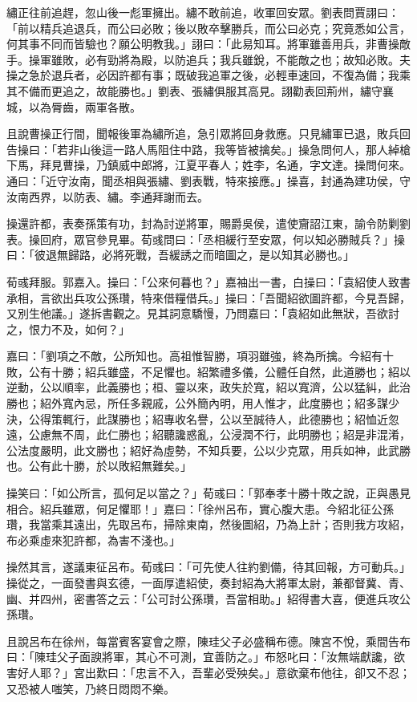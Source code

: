 繡正往前追趕，忽山後一彪軍擁出。繡不敢前追，收軍回安眾。劉表問賈詡曰：「前以精兵追退兵，而公曰必敗；後以敗卒擊勝兵，而公曰必克；究竟悉如公言，何其事不同而皆驗也？願公明教我。」詡曰：「此易知耳。將軍雖善用兵，非曹操敵手。操軍雖敗，必有勁將為殿，以防追兵；我兵雖銳，不能敵之也；故知必敗。夫操之急於退兵者，必因許都有事；既破我追軍之後，必輕車速回，不復為備；我乘其不備而更追之，故能勝也。」劉表、張繡俱服其高見。詡勸表回荊州，繡守襄城，以為脣齒，兩軍各散。

且說曹操正行間，聞報後軍為繡所追，急引眾將回身救應。只見繡軍已退，敗兵回告操曰：「若非山後這一路人馬阻住中路，我等皆被擒矣。」操急問何人，那人綽槍下馬，拜見曹操，乃鎮威中郎將，江夏平春人；姓李，名通，字文達。操問何來。通曰：「近守汝南，聞丞相與張繡、劉表戰，特來接應。」操喜，封通為建功侯，守汝南西界，以防表、繡。李通拜謝而去。

操還許都，表奏孫策有功，封為討逆將軍，賜爵吳侯，遣使齎詔江東，諭令防剿劉表。操回府，眾官參見畢。荀彧問曰：「丞相緩行至安眾，何以知必勝賊兵？」操曰：「彼退無歸路，必將死戰，吾緩誘之而暗圖之，是以知其必勝也。」

荀彧拜服。郭嘉入。操曰：「公來何暮也？」嘉袖出一書，白操曰：「袁紹使人致書承相，言欲出兵攻公孫瓚，特來借糧借兵。」操曰：「吾聞紹欲圖許都，今見吾歸，又別生他議。」遂拆書觀之。見其詞意驕慢，乃問嘉曰：「袁紹如此無狀，吾欲討之，恨力不及，如何？」

嘉曰：「劉項之不敵，公所知也。高祖惟智勝，項羽雖強，終為所擒。今紹有十敗，公有十勝；紹兵雖盛，不足懼也。紹繁禮多儀，公體任自然，此道勝也；紹以逆動，公以順率，此義勝也；桓、靈以來，政失於寬，紹以寬濟，公以猛糾，此治勝也；紹外寬內忌，所任多親戚，公外簡內明，用人惟才，此度勝也；紹多謀少決，公得策輒行，此謀勝也；紹專收名譽，公以至誠待人，此德勝也；紹恤近忽遠，公慮無不周，此仁勝也；紹聽讒惑亂，公浸潤不行，此明勝也；紹是非混淆，公法度嚴明，此文勝也；紹好為虛勢，不知兵要，公以少克眾，用兵如神，此武勝也。公有此十勝，於以敗紹無難矣。」

操笑曰：「如公所言，孤何足以當之？」荀彧曰：「郭奉孝十勝十敗之說，正與愚見相合。紹兵雖眾，何足懼耶！」嘉曰：「徐州呂布，實心腹大患。今紹北征公孫瓚，我當乘其遠出，先取呂布，掃除東南，然後圖紹，乃為上計；否則我方攻紹，布必乘虛來犯許都，為害不淺也。」

操然其言，遂議東征呂布。荀彧曰：「可先使人往約劉備，待其回報，方可動兵。」操從之，一面發書與玄德，一面厚遣紹使，奏封紹為大將軍太尉，兼都督冀、青、幽、并四州，密書答之云：「公可討公孫瓚，吾當相助。」紹得書大喜，便進兵攻公孫瓚。

且說呂布在徐州，每當賓客宴會之際，陳珪父子必盛稱布德。陳宮不悅，乘間告布曰：「陳珪父子面諛將軍，其心不可測，宜善防之。」布怒叱曰：「汝無端獻讒，欲害好人耶？」宮出歎曰：「忠言不入，吾輩必受殃矣。」意欲棄布他往，卻又不忍；又恐被人嗤笑，乃終日悶悶不樂。


